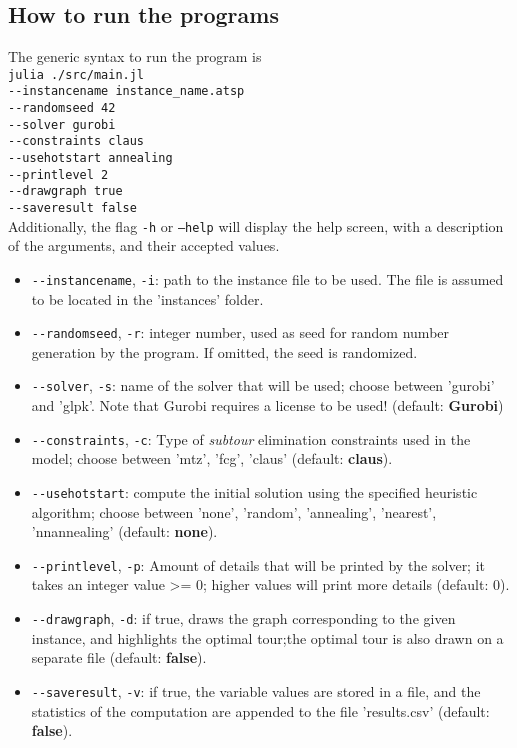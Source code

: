 \documentclass[
12pt,
a4paper,
oneside,
headinclude,
footinclude]{article}
\begin{document}
    \subsection{\textbf{How to run the programs}}
    The generic syntax to run the program is\\
    \-\quad\texttt{julia ./src/main.jl} \\
    \-\quad\quad\texttt{-{}-instancename instance\_name.atsp} \\
    \-\quad\quad\texttt{-{}-randomseed 42} \\
    \-\quad\quad\texttt{-{}-solver gurobi} \\
    \-\quad\quad\texttt{-{}-constraints claus} \\
    \-\quad\quad\texttt{-{}-usehotstart annealing} \\
    \-\quad\quad\texttt{-{}-printlevel 2} \\
    \-\quad\quad\texttt{-{}-drawgraph true} \\
    \-\quad\quad\texttt{-{}-saveresult false} \\
    
    Additionally, the flag \texttt{-h} or \texttt{--help} will display the help screen, with a description of the arguments, and their accepted values.
    
    \begin{itemize}
        \item \texttt{-{}-instancename}, \texttt{-i}: path to the instance file to be used. The file is assumed to be located in the 'instances' folder.
        \item \texttt{-{}-randomseed}, \texttt{-r}: integer number, used as seed for random number generation by the program. If omitted, the seed is randomized.
        \item \texttt{-{}-solver}, \texttt{-s}: name of the solver that will be used; choose between 'gurobi' and 'glpk'. Note that Gurobi requires a license to be used! (default: \textbf{Gurobi})
        \item \texttt{-{}-constraints}, \texttt{-c}: Type of \textit{subtour} elimination constraints used in the model; choose between 'mtz', 'fcg', 'claus' (default: \textbf{claus}).
        \item \texttt{-{}-usehotstart}: compute the initial solution using the specified heuristic algorithm; choose between 'none', 'random', 'annealing', 'nearest', 'nnannealing' (default: \textbf{none}).
        \item \texttt{-{}-printlevel}, \texttt{-p}: Amount of details that will be printed by the solver; it takes an integer value >= 0; higher values will print more details (default: \textbf{$0$}). 
        \item \texttt{-{}-drawgraph}, \texttt{-d}: if true, draws the graph corresponding to the given instance, and highlights the optimal tour;the optimal tour is also drawn on a separate file (default: \textbf{false}).
        \item \texttt{-{}-saveresult}, \texttt{-v}: if true, the variable values are stored in a file, and the statistics of the computation are appended to the file 'results.csv' (default: \textbf{false}).
    \end{itemize}
    
\end{document}
